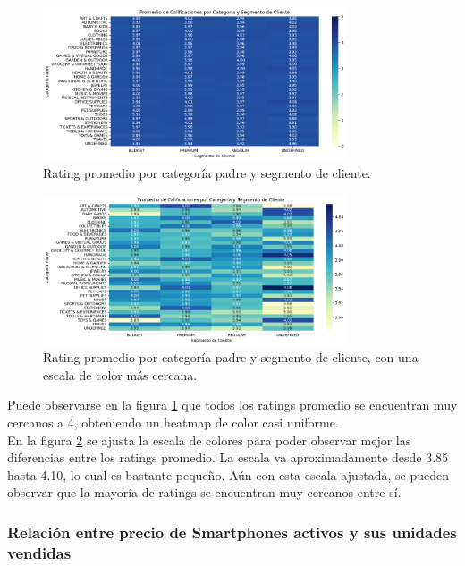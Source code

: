 \begin{figure}[H]
    \centering
    \includegraphics[width=0.8\textwidth]{imagenes/consultas_propias/rating_promedio_padre.png}
    \caption{Rating promedio por categoría padre y segmento de cliente.}
    \label{fig:rating_promedio}
\end{figure}
\vspace{-1em}
\begin{figure}[H]
    \centering
    \includegraphics[width=0.8\textwidth]{imagenes/consultas_propias/rating_promedio_padre_closer.png}
    \caption{Rating promedio por categoría padre y segmento de cliente, con una escala de color más cercana.}
    \label{fig:rating_promedio_closer}
\end{figure}
Puede observarse en la figura \ref{fig:rating_promedio} que todos los ratings promedio se encuentran muy cercanos a 4, obteniendo un heatmap de color casi uniforme. \\
En la figura \ref{fig:rating_promedio_closer} se ajusta la escala de colores para poder observar mejor las diferencias entre los ratings promedio. La escala va aproximadamente desde 3.85 hasta 4.10, lo cual es bastante pequeño. Aún con esta escala ajustada, se pueden observar que la mayoría de ratings se encuentran muy cercanos entre sí.

\subsubsection{Relación entre precio de Smartphones activos y sus unidades vendidas}

